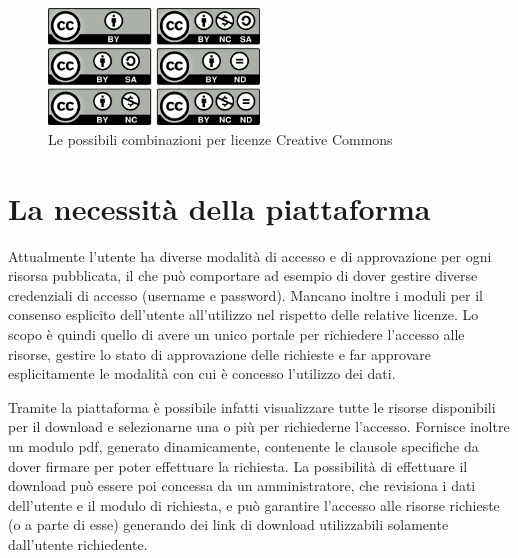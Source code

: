 \begin{figure}[ht]
	\centering
	\includegraphics[width=0.5\textwidth]{assets/creative-commons-licenses.png}
	\caption{Le possibili combinazioni per licenze Creative Commons}
\end{figure}



\section{La necessità della piattaforma}
Attualmente l'utente ha diverse modalità di accesso e di approvazione per ogni
risorsa pubblicata, il che può comportare ad esempio di dover gestire diverse
credenziali di accesso (username e password). Mancano inoltre i moduli per il
consenso esplicito dell'utente all'utilizzo nel rispetto delle relative licenze.
Lo scopo è quindi quello di avere un unico portale per richiedere l'accesso alle
risorse, gestire lo stato di approvazione delle richieste e far approvare
esplicitamente le modalità con cui è concesso l'utilizzo dei dati.

Tramite la piattaforma è possibile infatti visualizzare tutte le risorse
disponibili per il download e selezionarne una o più per richiederne l'accesso.
Fornisce inoltre un modulo pdf, generato dinamicamente, contenente le clausole
specifiche da dover firmare per poter effettuare la richiesta. La possibilità di
effettuare il download può essere poi concessa da un amministratore, che revisiona
i dati dell'utente e il modulo di richiesta, e può garantire l'accesso alle risorse
richieste (o a parte di esse) generando dei link di download utilizzabili
solamente dall'utente richiedente.